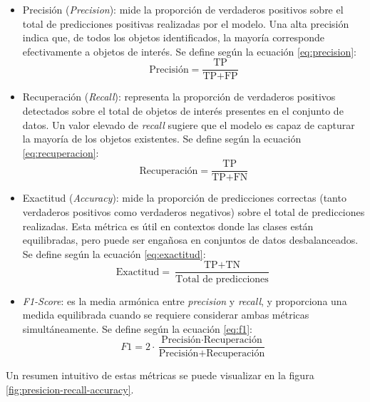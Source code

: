 \begin{itemize}
	\item Precisión (\textit{Precision}): mide la proporción de verdaderos positivos sobre el total de predicciones positivas realizadas por el modelo. Una alta precisión indica que, de todos los objetos identificados, la mayoría corresponde efectivamente a objetos de interés. Se define según la ecuación \ref{eq:precision}:
	      \begin{equation}
		      \text{Precisión} = \frac{\text{TP}}{\text{TP} + \text{FP}}
		      \label{eq:precision}
	      \end{equation}
	\item Recuperación (\textit{Recall}): representa la proporción de verdaderos positivos detectados sobre el total de objetos de interés presentes en el conjunto de datos. Un valor elevado de \textit{recall} sugiere que el modelo es capaz de capturar la mayoría de los objetos existentes. Se define según la ecuación \ref{eq:recuperacion}:
	      \begin{equation}
		      \text{Recuperación} = \frac{\text{TP}}{\text{TP} + \text{FN}}
		      \label{eq:recuperacion}
	      \end{equation}
	\item Exactitud (\textit{Accuracy}): mide la proporción de predicciones correctas (tanto verdaderos positivos como verdaderos negativos) sobre el total de predicciones realizadas. Esta métrica es útil en contextos donde las clases están equilibradas, pero puede ser engañosa en conjuntos de datos desbalanceados. Se define según la ecuación \ref{eq:exactitud}:
	      \begin{equation}
		      \text{Exactitud} = \frac{\text{TP} + \text{TN}}{\text{Total de predicciones}}
		      \label{eq:exactitud}
	      \end{equation}
	\item \textit{F1-Score}: es la media armónica entre \textit{precision} y \textit{recall}, y proporciona una medida equilibrada cuando se requiere considerar ambas métricas simultáneamente. Se define según la ecuación \ref{eq:f1}:
	      \begin{equation}
		      F1 = 2 \cdot \frac{\text{Precisión} \cdot \text{Recuperación}}{\text{Precisión} + \text{Recuperación}}
		      \label{eq:f1}
	      \end{equation}
\end{itemize}

Un resumen intuitivo de estas métricas se puede visualizar en la figura \ref{fig:presicion-recall-accuracy}.

